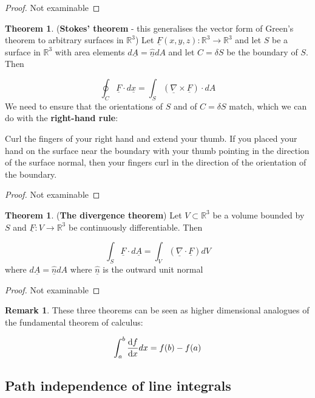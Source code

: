 \documentclass[12pt,a4paper]{article}
\theoremstyle{definition}
\newtheorem{theorem}[definition]{Theorem}
\newtheorem*{remark}{Remark}
\begin{document}
\begin{proof}
	Not examinable
\end{proof}

\begin{theorem}
	(\textbf{Stokes' theorem} - this generalises the vector form of Green's theorem to arbitrary surfaces in $\mathbb{R}^3$) Let $\underline{F}(x, y, z): \mathbb{R}^3 \rightarrow \mathbb{R}^3$ and let $S$ be a surface in $\mathbb{R}^3$ with area elements $d\underline{A} = \underline{\hat{n}} dA$ and let $C = \delta S$ be the boundary of $S$. Then

	\[ \oint_C \underline{F} \cdot d\underline{x} = \int_S \left( \underline{\nabla} \times \underline{F} \right) \cdot dA \]
	We need to ensure that the orientations of $S$ and of $C = \delta S$ match, which we can do with the \textbf{right-hand rule}:

	Curl the fingers of your right hand and extend your thumb. If you placed your hand on the surface near the boundary with your thumb pointing in the direction of the surface normal, then your fingers curl in the direction of the orientation of the boundary.
\end{theorem}

\begin{proof}
	Not examinable
\end{proof}

\begin{theorem}
	(\textbf{The divergence theorem}) Let $V \subset \mathbb{R}^3$ be a volume bounded by $S$ and $\underline{F}: V \rightarrow \mathbb{R}^3$ be continuously differentiable. Then

	\[ \int_S \underline{F} \cdot d\underline{A} = \int_V \left( \underline{\nabla} \cdot \underline{F} \right) dV \]
	where $d\underline{A} = \underline{\hat{n}} dA$ where $\underline{\hat{n}}$ is the outward unit normal
\end{theorem}

\begin{proof}
	Not examinable
\end{proof}

\begin{remark}
	These three theorems can be seen as higher dimensional analogues of the fundamental theorem of calculus:

	\[ \int_a^b \diff{f}{x} dx = f(b) - f(a) \]
\end{remark}

\subsection{Path independence of line integrals}
\end{document}
